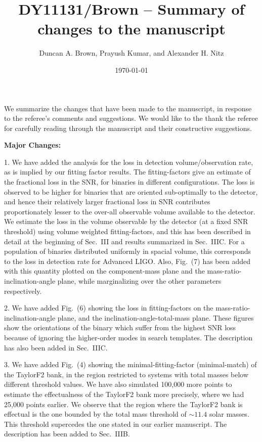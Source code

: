 \documentclass[a4paper,10pt]{article}
\title{DY11131/Brown -- Summary of changes to the manuscript}
\author{Duncan A. Brown, Prayush Kumar, and Alexander H. Nitz}
\date{\today}
\begin{document}
\maketitle
We summarize the changes that have been made to the manuscript, in response
to the referee's comments and suggestions. We would like to the thank the 
referee for carefully reading through the manuscript and their constructive
suggestions.
\newline

\textbf{Major Changes:}
\newline

1. We have added the analysis for the loss in detection volume/observation
rate, as is implied by our fitting factor results. The fitting-factors give
an estimate of the fractional loss in the SNR, for binaries in different 
configurations. The loss is observed to be higher for binaries that are 
oriented sub-optimally to the detector, and hence their relatively larger
fractional loss in SNR contributes proportionately lesser to the over-all
observable volume available to the detector. We estimate the loss in the 
volume observable by the detector (at a fixed SNR threshold) using volume 
weighted fitting-factors, and this has been described in detail at the beginning
of Sec.~III and results summarized in Sec.~IIIC. For a population of binaries 
distributed uniformly in spacial volume, this corresponds to the loss in 
detection rate for Advanced LIGO. Also, Fig.~(7) has been
added with this quantity plotted on the component-mass plane and the mass-ratio-
inclination-angle plane, while marginalizing over the other parameters 
respectively.
\newline

2. We have added Fig.~(6) showing the loss in fitting-factors on the mass-ratio-
inclination-angle plane, and the inclination-angle-total-mass plane. These
figures show the orientations of the binary which suffer from the highest
SNR loss because of ignoring the higher-order modes in search templates.
The description has also been added in Sec.~IIIC.
\newline

3. We have added Fig.~(4) showing the minimal-fitting-factor (minimal-match)
of the TaylorF2 bank, in the region restricted to systems with total masses
below different threshold values. We have also simulated 100,000 more points 
to estimate the effectualness of the TaylorF2 bank more precisely, where we had 
25,000 points earlier. We observe that the region where the TaylorF2 bank is 
effectual is the one bounded by the total mass threshold of $\sim 11.4$ solar 
masses. This threshold supercedes the one stated in our earlier manuscript.
The description has been added to Sec.~IIIB.
\newline
\end{document}
